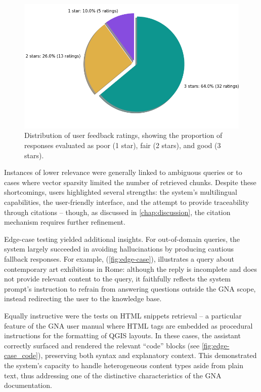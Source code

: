 \begin{spacing}{1.5}
\vspace{0.9em}
\begin{figure}[H]
  \centering
  \includegraphics[width=\textwidth]{images/rating_proportions.png} 
  \caption{Distribution of user feedback ratings, showing the proportion of responses evaluated as poor (1 star), fair (2 stars), and good (3 stars).}
  \label{fig:ratings_}
\end{figure}

Instances of lower relevance were generally linked to ambiguous queries or to cases where vector sparsity limited the number of retrieved chunks. Despite these shortcomings, users highlighted several strengths: the system’s multilingual capabilities, the user-friendly interface, and the attempt to provide traceability through citations -- though, as discussed in \autoref{chap:discussion}, the citation mechanism requires further refinement.

Edge-case testing yielded additional insights. For out-of-domain queries, the system largely succeeded in avoiding hallucinations by producing cautious fallback responses. For example, (\autoref{fig:edge-case}), illustrates a query about contemporary art exhibitions in Rome: although the reply is incomplete and does not provide relevant content to the query, it faithfully reflects the system prompt’s instruction to refrain from answering questions outside the GNA scope, instead redirecting the user to the knowledge base.

Equally instructive were the tests on HTML snippets retrieval -- a particular feature of the GNA user manual where HTML tags are embedded as procedural instructions for the formatting of QGIS layouts. In these cases, the assistant correctly surfaced and rendered the relevant ``code'' blocks (see \autoref{fig:edge-case_code}), preserving both syntax and explanatory context. This demonstrated the system’s capacity to handle heterogeneous content types aside from plain text, thus addressing one of the distinctive characteristics of the GNA documentation.\\


\end{spacing}
